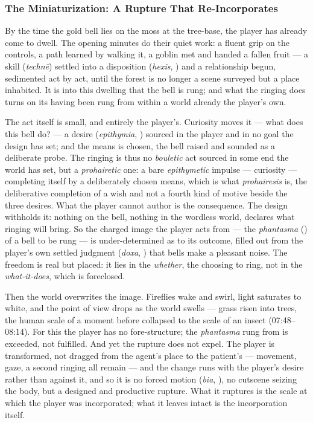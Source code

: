 \subsubsection*{The Miniaturization: A Rupture That Re-Incorporates}

By the time the gold bell lies on the moss at the tree-base, the player has already come to dwell. The opening minutes do their quiet work: a fluent grip on the controls, a path learned by walking it, a goblin met and handed a fallen fruit — a skill (\textit{technē}) settled into a disposition (\textit{hexis}, ) and a relationship begun, sedimented act by act, until the forest is no longer a scene surveyed but a place inhabited. It is into this dwelling that the bell is rung; and what the ringing does turns on its having been rung from within a world already the player's own.

The act itself is small, and entirely the player's. Curiosity moves it — what does this bell do? — a desire (\textit{epithymia}, ) sourced in the player and in no goal the design has set; and the means is chosen, the bell raised and sounded as a deliberate probe. The ringing is thus no \textit{bouletic} act sourced in some end the world has set, but a \textit{prohairetic} one: a bare \textit{epithymetic} impulse — curiosity — completing itself by a deliberately chosen means, which is what \textit{prohairesis} is, the deliberative completion of a wish and not a fourth kind of motive beside the three desires. What the player cannot author is the consequence. The design withholds it: nothing on the bell, nothing in the wordless world, declares what ringing will bring. So the charged image the player acts from — the \textit{phantasma} () of a bell to be rung — is under-determined as to its outcome, filled out from the player's own settled judgment (\textit{doxa}, ) that bells make a pleasant noise. The freedom is real but placed: it lies in the \textit{whether}, the choosing to ring, not in the \textit{what-it-does}, which is foreclosed.

Then the world overwrites the image. Fireflies wake and swirl, light saturates to white, and the point of view drops as the world swells — grass risen into trees, the human scale of a moment before collapsed to the scale of an insect (07:48–08:14). For this the player has no fore-structure; the \textit{phantasma} rung from is exceeded, not fulfilled. And yet the rupture does not expel. The player is transformed, not dragged from the agent's place to the patient's — movement, gaze, a second ringing all remain — and the change runs with the player's desire rather than against it, and so it is no forced motion (\textit{bia}, ), no cutscene seizing the body, but a designed and productive rupture. What it ruptures is the scale at which the player was incorporated; what it leaves intact is the incorporation itself.

